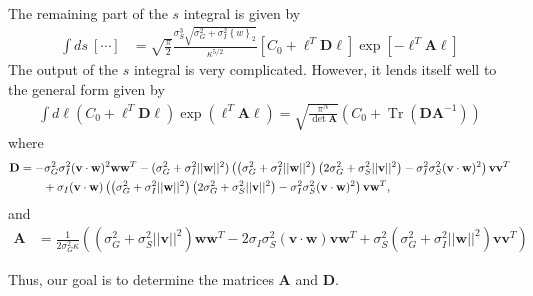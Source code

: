 \documentclass[11pt]{article}
\DeclareMathOperator{\Tr}{Tr}
\begin{document}
The remaining part of the $s$ integral is given by
\begin{align}
\int ds  \ [\cdots] &= \sqrt{\frac{\pi}{2}} \frac{\sigma_S^3 \sqrt{\sigma_G^2 +\sigma_I^2 \left\{w\right\}_2}}{\kappa^{5/2}} \left[C_0 + \boldsymbol{\ell}^T \mathbf{D} \boldsymbol{\ell}\right] \exp\left[-\boldsymbol{\ell}^T \mathbf{A} \boldsymbol{\ell}\right]
\end{align}
The output of the $s$ integral is very complicated. However, it lends itself well to the general form given by
\begin{align}
	\int d\boldsymbol{\ell} \left(C_0 +\boldsymbol{\ell}^T \mathbf{D} \boldsymbol{\ell}\right)\exp\left(\boldsymbol{\ell}^T \mathbf{A} \boldsymbol{\ell}\right) = \sqrt{\frac{\pi^N}{\det \mathbf{A}}}\left(C_0 + \Tr\left(\mathbf{D}\mathbf{A}^{-1}\right)\right)
\end{align}
where 
\begin{align}
	\mathbf{D} &= -\sigma_G^2 \sigma_I^2 (\mathbf{v}\cdot\mathbf{w})^2  \mathbf{w}\mathbf{w}^T - (\sigma_G^2 +\sigma_I^2 ||\mathbf{w}||^2)\left(\left(\sigma_G^2+\sigma_I^2 ||\mathbf{w}||^2\right) \left(2 \sigma_G^2+\sigma_S^2 ||\mathbf{v}||^2\right) - \sigma_I^2 \sigma_S^2 (\mathbf{v}\cdot\mathbf{w})^2\right)\mathbf{v}\mathbf{v}^T \notag \\
	&\qquad + \sigma_I (\mathbf{v} \cdot \mathbf{w}) \left(\left(\sigma_G^2+\sigma_I^2 ||\mathbf{w}||^2\right) \left(2 \sigma_G^2+\sigma_S^2 ||\mathbf{v}||^2\right) - \sigma_I^2 \sigma_S^2 (\mathbf{v}\cdot\mathbf{w})^2\right)\mathbf{v}\mathbf{w}^T,
\end{align}
and 
\begin{align}
	\mathbf{A} &= \frac{1}{2 \sigma_G^2 \kappa} \left((\sigma_G^2 + \sigma_S^2 ||\mathbf{v}||^2 ) \mathbf{w}\mathbf{w}^T - 2 \sigma_I \sigma_S^2 (\mathbf{v}\cdot\mathbf{w})\mathbf{v}\mathbf{w}^T  +\sigma_S^2 (\sigma_G^2 + \sigma_I^2 ||\mathbf{w}||^2)\mathbf{v}\mathbf{v}^T\right)
\end{align}

Thus, our goal is to determine the matrices $\mathbf{A}$ and $\mathbf{D}$. 
\end{document}

